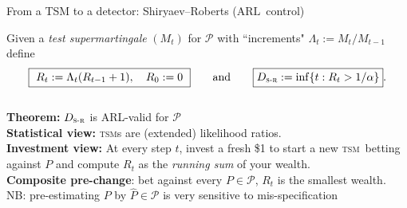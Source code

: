 \documentclass[10pt,aspectratio=169]{beamer}
\newcommand{\Mt}{M_{t}}
\newcommand{\Rt}{R_{t}}
\newcommand{\TSM}{\textsc{tsm}}
\newcommand{\SR}{\textsc{s-r}}
\newcommand{\ARL}{\ensuremath{\mathrm{ARL}}}
\begin{document}
 

\begin{frame}{From a TSM to a detector: Shiryaev--Roberts (\ARL\ control)}
 
  Given a \emph{test supermartingale} $(M_t)$ for $\mathcal{P}$ with ``increments" $\Lambda_t := M_t/M_{t-1}$ define
 \[
    \boxed{\ \Rt := \Lambda_t (R_{t-1} + 1), \quad R_0 := 0 \ }
    \qquad\mbox{and}\qquad
    \boxed{D_{\SR} := \inf\{t : \Rt > 1/\alpha\}}.
  \]\\
  \vspace{3mm}
  \pause
  \textbf{Theorem:} $D_{\SR}$ is ARL-valid for $\mathcal{P}$ \citep{shiryaev_1963}\\
  \pause
  \medskip
  \vspace{3mm}
  \textbf{Statistical view:} \TSM s are (extended) likelihood ratios.\\
  \vspace{3mm}
  \textbf{Investment view:} At every step $t$, invest a fresh \$1 to start a new \TSM\
  betting against $P$ and compute $\Rt$ as the \emph{running sum} of your wealth. \\
  \medskip
  \vspace{3mm}
  \textbf{Composite pre-change}: bet against every $P \in \mathcal{P}$, $R_t$ is the smallest wealth.\\
  \vspace{3mm}
  \small
  NB: pre-estimating $P$ by $\widehat{P} \in \mathcal{P}$ is very sensitive to mis-specification \citep{mei2006sequential}

  
\end{frame}
\end{document}
